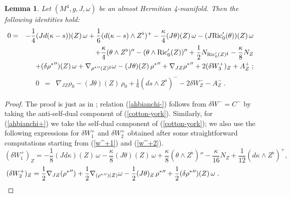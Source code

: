 \documentclass{amsart}
\newtheorem{lemma}[theorem]{Lemma}
\begin{document}
\begin{lemma} \label{Bianchi-lem} Let $(M^4, g, J, \omega)$ be an
almost Hermitian 4-manifold. Then the following identities hold: %
\begin{eqnarray}\label{ahbianchi+} \nonumber
 0 &=& -\frac{1}{4} (Jd(\kappa - s))(Z)\,\omega + \frac{1}{6} (d(\kappa - s) \wedge Z^{\flat})^+ - \frac{\kappa}{4} (J\theta)(Z) \, \omega - (J{\rm Ric}_0'(\theta))(Z) \, \omega \\ 
& & +\frac{\kappa}{4} (\theta \wedge Z^{\flat} )'' - (\theta \wedge {\rm Ric}_0'(Z))'' + \frac{1}{2} N_{{\rm Ric}_0'(Z)^\sharp} - \frac{\kappa}{8} N_Z   \\ \nonumber
& & + (\delta {\rho^*}'')(Z) \, \omega + \nabla_{{\rho^*}''(Z)^\sharp} \omega - (J\theta)(Z) \, {\rho^*}''  + \nabla_{JZ} {\rho^*}'' + 2(\delta W_3^+)_Z + A^+_Z  \; ; 
\end{eqnarray}
\begin{eqnarray}
\label{ahbianchi-} 0 &=& \nabla_{JZ} \rho_0 -(J\theta)(Z) \, \rho_0 + \frac{1}{6} (d s \wedge Z^{\flat})^- - 2\delta W^-_{Z} - A^-_Z \; .
\end{eqnarray}
\end{lemma}
\begin{proof} The proof is just as in \cite{AAD}; relation (\ref{ahbianchi-}) follows from $\delta W^{-} = C ^{-}$ by taking the anti-self-dual component of
(\ref{cotton-york}). Similarly, for (\ref{ahbianchi+}) we take the
self-dual component of (\ref{cotton-york}); we also use the
following expressions for $\delta W_1^+$ and $\delta W_2^+$ obtained after some straightforward computations starting from (\ref{w^+1}) and (\ref{w^+2}).
\begin{equation*}
(\delta W_1^+)_Z = -\frac{1}{8} (Jd\kappa)(Z) \, \omega -\frac{\kappa}{8} (J\theta)(Z) \, \omega + \frac{\kappa}{8} (\theta \wedge Z^{\flat})'' - \frac{\kappa}{16} N_Z  + \frac{1}{12} (d\kappa \wedge Z^{\flat})^+ ,
\end{equation*}
\begin{equation*} 
(\delta W^+_2)_Z = \frac{1}{2} \nabla_{JZ} ({\rho^*}'')  +
\frac{1}{2} \nabla_{({\rho^*}'')(Z)} \omega  - \frac{1}{2} (J\theta)_Z \, \rho^{*}{''} + \frac{1}{2} (\delta
\rho^{*}{''})(Z) \, \omega \; . \hspace{1.8cm}
\end{equation*}

\end{proof}
\end{document}
